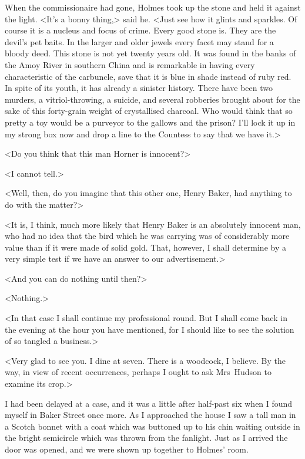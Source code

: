When the commissionaire had gone, Holmes took up the stone and held it against the light. <It's a bonny thing,> said he. <Just see how it glints and sparkles. Of course it is a nucleus and focus of crime. Every good stone is. They are the devil's pet baits. In the larger and older jewels every facet may stand for a bloody deed. This stone is not yet twenty years old. It was found in the banks of the Amoy River in southern China and is remarkable in having every characteristic of the carbuncle, save that it is blue in shade instead of ruby red. In spite of its youth, it has already a sinister history. There have been two murders, a vitriol-throwing, a suicide, and several robberies brought about for the sake of this forty-grain weight of crystallised charcoal. Who would think that so pretty a toy would be a purveyor to the gallows and the prison? I'll lock it up in my strong box now and drop a line to the Countess to say that we have it.>

<Do you think that this man Horner is innocent?>

<I cannot tell.>

<Well, then, do you imagine that this other one, Henry Baker, had anything to do with the matter?>

<It is, I think, much more likely that Henry Baker is an absolutely innocent man, who had no idea that the bird which he was carrying was of considerably more value than if it were made of solid gold. That, however, I shall determine by a very simple test if we have an answer to our advertisement.>

<And you can do nothing until then?>

<Nothing.>

<In that case I shall continue my professional round. But I shall come back in the evening at the hour you have mentioned, for I should like to see the solution of so tangled a business.>

<Very glad to see you. I dine at seven. There is a woodcock, I believe. By the way, in view of recent occurrences, perhaps I ought to ask Mrs~Hudson to examine its crop.>

I had been delayed at a case, and it was a little after half-past six when I found myself in Baker Street once more. As I approached the house I saw a tall man in a Scotch bonnet with a coat which was buttoned up to his chin waiting outside in the bright semicircle which was thrown from the fanlight. Just as I arrived the door was opened, and we were shown up together to Holmes' room.

